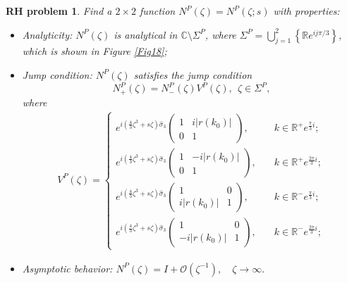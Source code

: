 \documentclass[11pt]{article}
\numberwithin{equation}{section}
\newtheorem{RHP}{RH problem}
\begin{document}
\begin{RHP}\label{rhp24}
    Find  a $2\times2$ function $    N^{P} ( \zeta)=  N^{P} (\zeta;s )$ with properties:
    \begin{itemize}
        \item Analyticity: $N^{P} ( \zeta)$ is analytical  in $\mathbb{C} \setminus \Sigma^{P} $, where $\Sigma^P=\displaystyle\bigcup_{j=1}^2 \left\{\mathbb{R} e^{{ i} j\pi/3 }  \right\}$, which is shown in Figure \ref{Fig18};
        \item Jump condition: $N^{P} ( \zeta)$ satisfies the  jump condition \begin{equation*}
             N^{P}_+( \zeta)=  N^{P}_-(\zeta)  V^{P}(\zeta), \ \ \zeta\in   \Sigma^{P},
        \end{equation*}
        where
            \begin{align}
       	 {V}^{P}( \zeta)= \begin{cases}
        e^{ i \left(\frac{4}{3} \zeta^3 + s\zeta\right)\widehat{\sigma}_3  } \left( \begin{array}{cc}
       		1&
       		i |r(k_0)|\\0 & 1
       	\end{array}\right),\quad &k \in \mathbb{R}^+ e^{\frac{\pi}{3}i };\\[8pt]
       e^{ i \left(\frac{4}{3}  \zeta^3 + s\zeta\right)\widehat{\sigma}_3  } \left( \begin{array}{cc}
       		1&
       		-i |r(k_0)| \\0& 1
       	\end{array}\right),\quad &k \in   \mathbb{R}^+ e^{\frac{2\pi}{3}i };\\[8pt]
       	 e^{ i \left(\frac{4}{3}  \zeta^3 + s\zeta\right)\widehat{\sigma}_3  } \left(	\begin{array}{cc}
       			1&0\\  i | r(k_0)|  & 1
       		\end{array}\right) ,\quad &k \in \mathbb{R}^- e^{\frac{\pi}{3}i };\\
       e^{ i \left(\frac{4}{3}  \zeta^3 + s\zeta\right)\widehat{\sigma}_3  } \left(	\begin{array}{cc}
       			1& 0\\ -i | r(k_0) |  & 1
       		\end{array}\right) ,\quad& k \in  \mathbb{R}^- e^{\frac{2\pi}{3}i };	
       	\end{cases}
       \end{align}
        \item  Asymptotic behavior: $ N^{P}( \zeta)=I+\mathcal{O}(\zeta ^{-1}),	\quad \zeta \to  \infty. $

\end{itemize}
\end{RHP}
\end{document}
